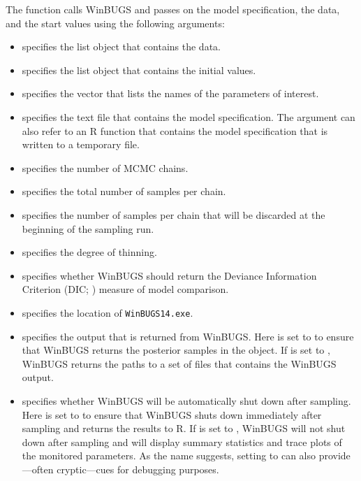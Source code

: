 \noindent The  function calls WinBUGS and passes on the model specification, the data, and the start values using the following arguments:
\begin{itemize}
\item {} specifies the list object that contains the data.
\item {} specifies the list object that contains the initial values.
\item {} specifies the vector that lists the names of the parameters of interest.
\item {} specifies the text file that contains the model specification. The  argument can also refer to an R function that contains the model specification that is written to a temporary file.
\item {} specifies the number of MCMC chains.
\item {} specifies the total number of samples per chain.
\item {} specifies the number of samples per chain that will be discarded at the beginning of the sampling run.
\item {} specifies the degree of thinning.
\item {} specifies whether WinBUGS should return the Deviance Information Criterion (DIC; ) measure of model comparison. 
\item {} specifies the location of \texttt{WinBUGS14.exe}.
\item {} specifies the output that is returned from WinBUGS. Here  is set to  to ensure that
WinBUGS returns the posterior samples in the  object. If  is set to , WinBUGS returns the paths to a set of files that contains the WinBUGS output.  
\item {} specifies whether WinBUGS will be automatically shut down after sampling. Here  is set to  to ensure that WinBUGS shuts down immediately after sampling and returns the results to R. If  is set to , WinBUGS will not shut down after sampling and will display summary statistics and trace plots of the monitored parameters. As the name suggests, setting  to  can also provide---often cryptic---cues for debugging purposes.
\end{itemize}

